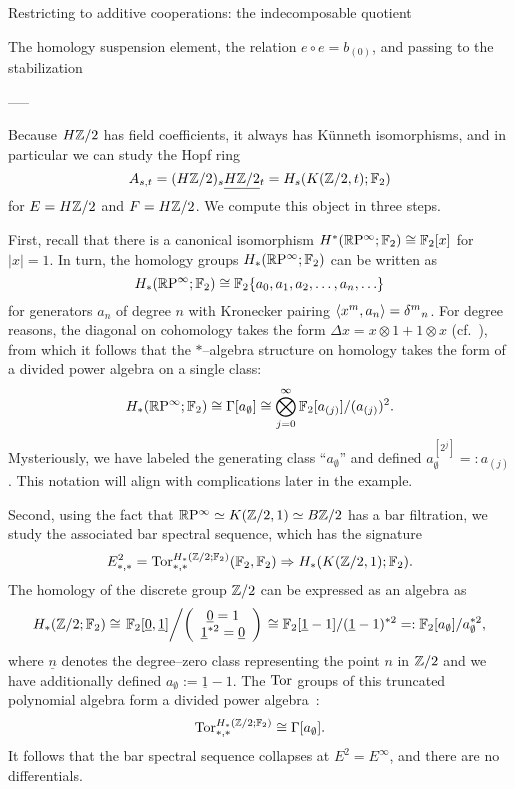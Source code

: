 Restricting to additive cooperations: the indecomposable quotient

The homology suspension element, the relation $e \circ e = b_{(0)}$, and passing to the stabilization


-----

\begin{example}
Because $H\mathbb Z/2$ has field coefficients, it always has K\"unneth isomorphisms, and in particular we can study the Hopf ring \[A_{s, t} = (H\mathbb Z/2)_s \smash{\underline{H\mathbb Z/2}}_{t} = H_s(K(\mathbb Z/2, t); \mathbb F_2)\] for $E = H\mathbb Z/2$ and $F = H\mathbb Z/2$.  We compute this object in three steps.

First, recall that there is a canonical isomorphism $H^*(\mathbb R\mathrm P^\infty; \mathbb F_2) \cong \mathbb F_2[x]$ for $|x| = 1$.  In turn, the homology groups $H_*(\mathbb R\mathrm P^\infty; \mathbb F_2)$ can be written as \[H_*(\mathbb R\mathrm P^\infty; \mathbb F_2) \cong \mathbb F_2\{a_0, a_1, a_2, \ldots, a_n, \ldots\}\] for generators $a_n$ of degree $n$ with Kronecker pairing $\langle x^m, a_n\rangle = \delta{}^m{}_n$.  For degree reasons, the diagonal on cohomology takes the form $\Delta x = x \otimes 1 + 1 \otimes x$ (cf.\ ), from which it follows that the $\ast$--algebra structure on homology takes the form of a divided power algebra on a single class: \[H_*(\mathbb R\mathrm P^\infty; \mathbb F_2) \cong \Gamma[a_\emptyset] \cong \bigotimes_{j=0}^\infty \mathbb F_2[a_{(j)}] / (a_{(j)})^2.\]  Mysteriously, we have labeled the generating class ``$a_\emptyset$'' and defined $a_\emptyset^{[2^j]} =: a_{(j)}$. This notation will align with complications later in the example.

Second, using the fact that $\mathbb R\mathrm P^\infty \simeq K(\mathbb Z/2, 1) \simeq B\mathbb Z/2$ has a bar filtration, we study the associated bar spectral sequence, which has the signature \[E^2_{*, *} = \operatorname{Tor}^{H_*(\mathbb Z/2; \mathbb F_2)}_{*, *}(\mathbb F_2, \mathbb F_2) \Rightarrow H_*(K(\mathbb Z/2, 1); \mathbb F_2).\]  The homology of the discrete group $\mathbb Z/2$ can be expressed as an algebra as
\[
H_*(\mathbb Z/2; \mathbb F_2) \cong \left. \mathbb F_2[\underline 0, \underline 1] \middle/ \left(\begin{array}{c} \underline 0 = 1 \\ \underline 1^{\ast 2} = \underline 0\end{array}\right) \right. \cong \mathbb F_2[\underline 1 - 1] / (\underline 1 - 1)^{\ast 2} =: \mathbb F_2[a_\emptyset] / a_\emptyset^{\ast 2},
\]
where $\underline n$ denotes the degree--zero class representing the point $n$ in $\mathbb Z/2$ and we have additionally defined $a_\emptyset := \underline 1 - 1$.  The $\operatorname{Tor}$ groups of this truncated polynomial algebra form a divided power algebra~\cite{TateResolutions}: \[\operatorname{Tor}^{H_*(\mathbb Z/2; \mathbb F_2)}_{*, *} \cong \Gamma[a_\emptyset].\]  It follows that the bar spectral sequence collapses at $E^2 = E^\infty$, and there are no differentials.


\end{example}
